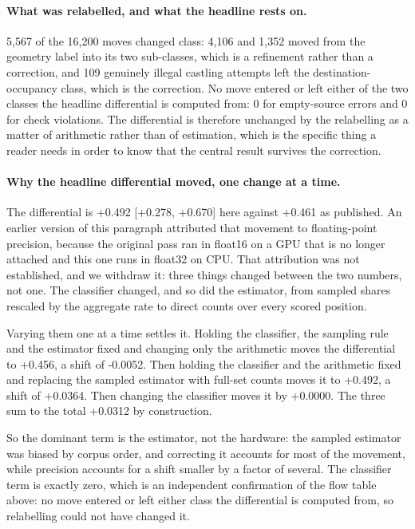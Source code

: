 \documentclass[11pt]{article}
\begin{document}
\paragraph{What was relabelled, and what the headline rests on.}
5,567 of the 16,200 moves changed class: 4,106 and 1,352 moved from
the geometry label into its two sub-classes, which is a refinement rather than a
correction, and 109 genuinely illegal castling attempts left the
destination-occupancy class, which is the correction. No move entered or left either
of the two classes the headline differential is computed from: 0 for
empty-source errors and 0 for check violations. The differential is
therefore unchanged by the relabelling as a matter of arithmetic rather than of
estimation, which is the specific thing a reader needs in order to know that the
central result survives the correction.

\paragraph{Why the headline differential moved, one change at a time.}
The differential is +0.492 [+0.278, +0.670] here
against +0.461 as published. An earlier version of this paragraph attributed that
movement to floating-point precision, because the original pass ran in float16 on a
GPU that is no longer attached and this one runs in float32 on CPU. That attribution
was not established, and we withdraw it: three things changed between the two
numbers, not one. The classifier changed, and so did the estimator, from sampled
shares rescaled by the aggregate rate to direct counts over every scored position.

Varying them one at a time settles it. Holding the classifier, the sampling rule and
the estimator fixed and changing only the arithmetic moves the differential to
+0.456, a shift of -0.0052. Then holding the classifier and the arithmetic
fixed and replacing the sampled estimator with full-set counts moves it to
+0.492, a shift of +0.0364. Then changing the classifier moves it by
+0.0000. The three sum to the total +0.0312 by construction.

So the dominant term is the estimator, not the hardware: the sampled estimator was
biased by corpus order, and correcting it accounts for most of the movement, while
precision accounts for a shift smaller by a factor of several. The classifier term is
exactly zero, which is an independent confirmation of the flow table above: no move
entered or left either class the differential is computed from, so relabelling could
not have changed it.
\end{document}
